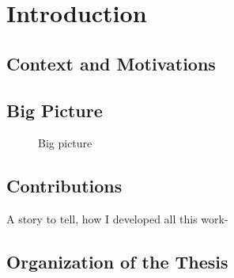 \chapter{Introduction}
\section{Context and Motivations}
\section{Big Picture}
\begin{figure}
    
    \caption{Big picture}
\end{figure}

\section{Contributions}
A story to tell, how I developed all this work-
\section{Organization of the Thesis}